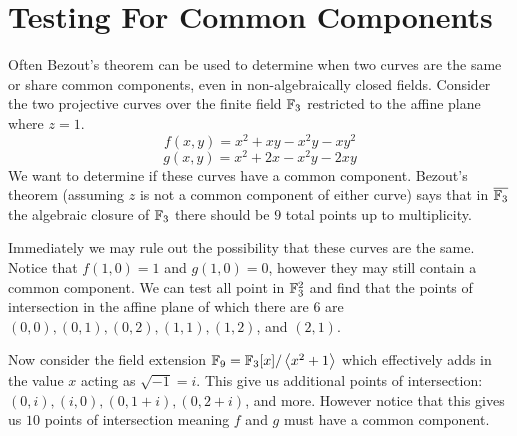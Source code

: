 \section{Testing For Common Components}
Often Bezout's theorem can be used to determine when two curves are the same or share common components, even in non-algebraically closed fields. Consider the two projective curves over the finite field $\mathbb{F}_3$ restricted to the affine plane where $z=1$.
$$f\left(x,y\right)=x^{2}+xy-x^{2}y-xy^{2}$$
$$g\left(x,y\right)=x^{2}+2x-x^{2}y-2xy$$
We want to determine if these curves have a common component. Bezout's theorem (assuming $z$ is not a common component of either curve) says that in $\overline{\mathbb{F}_3}$ the algebraic closure of $\mathbb{F}_3$ there should be $9$ total points up to multiplicity.

Immediately we may rule out the possibility that these curves are the same. Notice that $f(1,0)=1$ and $g(1,0)=0$, however they may still contain a common component. We can test all point in $\mathbb{F}_3^2$ and find that the points of intersection in the affine plane of which there are $6$ are $(0,0),(0,1),(0,2),(1,1),(1,2)$, and $(2,1)$.

Now consider the field extension $\mathbb{F}_9=\mathbb{F}_3[x]/\left\langle x^2+1 \right\rangle$ which effectively adds in the value $x$ acting as $\sqrt{-1}=i$. This give us additional points of intersection: $(0,i),(i,0),(0,1+i),(0,2+i)$, and more. However notice that this gives us $10$ points of intersection meaning $f$ and $g$ must have a common component.